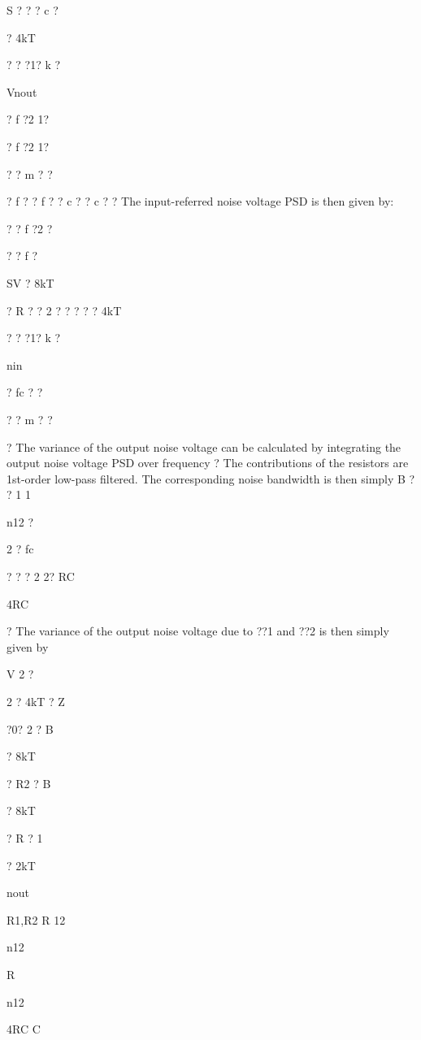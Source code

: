 \documentclass[2pt,landscape]{article}
\begin{document}
\begin{multicols*}{5}
S	?	?	? c ?


? 4kT


?	? ?1? k ?




Vnout


? f ?2
1?




? f ?2
1?




?	?
m	?	?


? f ?	? f ?
? c ?	? c ?
?	The input-referred noise voltage PSD is then given by:


?	? f ?2 ?


?	?	f ?


SV	? 8kT


? R ? ? 2 ? ?	? ? ? 4kT




?	? ?1? k ?




nin


?	fc ? ?


?	?
m	?	?






?	The variance of the output noise voltage can be calculated by 
integrating the output noise voltage PSD over frequency
?	The contributions of the resistors are 1st-order low-pass filtered. The 
corresponding noise bandwidth is then simply
B	?	?	1	1



n12 ?


2 ? fc


?	?	?
2	2? RC


4RC


?	The variance of the output noise voltage due to ??1 and ??2 is then
simply given by



V 2	?


2 ? 4kT ? Z


?0? 2 ? B


? 8kT


? R2 ? B


? 8kT


? R ?	1


? 2kT



nout


R1,R2	R	12


n12

R


n12


4RC	C



\end{multicols*}
\end{document}
